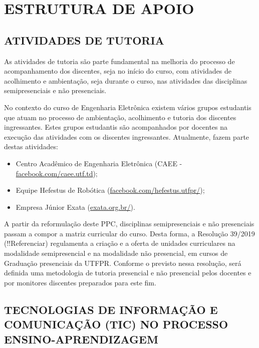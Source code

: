 \chapter{ESTRUTURA DE APOIO}


\section{ATIVIDADES DE TUTORIA}

As atividades de tutoria são parte fundamental na melhoria do processo de acompanhamento dos discentes, seja no início do curso, com atividades de acolhimento e ambientação, seja durante o curso, nas atividades das disciplinas semipresenciais e não presenciais.

No contexto do curso de Engenharia Eletrônica existem vários grupos estudantis que atuam no processo de ambientação, acolhimento e tutoria dos discentes ingressantes. Estes grupos estudantis são acompanhados por docentes na execução das atividades com os discentes ingressantes. Atualmente, fazem parte destas atividades:

\begin{itemize}
    \item Centro Acadêmico de Engenharia Eletrônica (CAEE -  \url{facebook.com/caee.utf.td});
    \item Equipe Hefestus de Robótica (\url{facebook.com/hefestus.utfpr/});
    \item Empresa Júnior Exata (\url{exata.org.br/}).
\end{itemize}
    
A partir da reformulação deste PPC, disciplinas semipresenciais e não presenciais passam a compor a matriz curricular do curso. Desta forma, a Resolução 39/2019  (!!Referenciar) regulamenta a criação e a oferta de unidades curriculares na modalidade semipresencial e na modalidade não presencial, em cursos de Graduação presenciais da UTFPR. Conforme o previsto nessa resolução, será definida uma metodologia de tutoria presencial e não presencial pelos docentes e por monitores discentes preparados para este fim.

\section{TECNOLOGIAS DE INFORMAÇÃO E COMUNICAÇÃO (TIC) NO PROCESSO ENSINO-APRENDIZAGEM}
\label{sec:tic}



